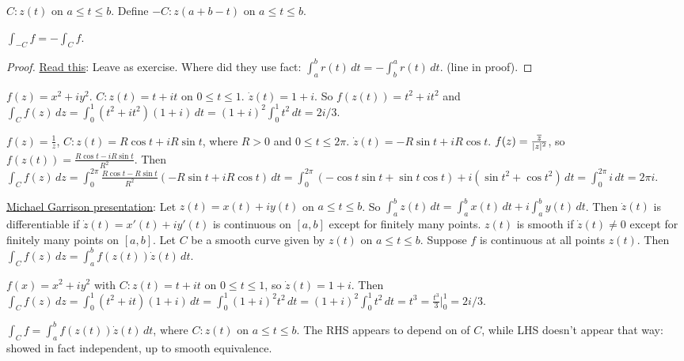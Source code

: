 \documentclass[]{article}
\begin{document}
\begin{definition}
	$C: z(t)$ on $a\leq t \leq b$. Define $-C: z(a+b-t)$ on $a\leq t \leq b$.
\end{definition}
\begin{proposition}
	$\int_{-C} f = -\int_C f$.
\end{proposition}
\begin{proof}
	\underline{Read this}: Leave as exercise. Where did they use fact: $\int_a^b r(t) \, dt = -\int_b^a r(t) \, dt$. (line in proof).
\end{proof}
\begin{example}
	$f(z) = x^2 + iy^2$. $C: z(t) = t+ it$ on $0\leq t \leq 1$. $\dot{z} (t) = 1+i$. So $f(z(t)) = t^2 + it^2$ and $\int_C f(z) \, dz = \int_0^1 (t^2+it^2) ( 1+i) \, dt = (1+i)^2\int_0^1 t^2\, dt = 2i/3$.
\end{example}
\begin{example}
	$f(z) = \frac{1}{z}$, $C:z(t) = R\cos{t} + iR\sin{t}$, where $R>0$ and $0\leq t\leq 2\pi$. $\dot{z}(t) = -R\sin{t} + iR\cos{t}$. $f(z) = \frac{\overline{z}}{|z|^2}$, so $f(z(t)) = \frac{R\cos{t}-iR\sin{t}}{R^2}$. Then $\int_C f(z) \, dz = \int_0^{2\pi} \frac{R\cos{t} - R\sin{t}}{R^2}\left(-R\sin{t} + iR\cos{t}\right) \, dt = \int_0^{2\pi} (-\cos{t}\sin{t}+\sin{t}\cos{t}) + i(\sin{t}^2 + \cos{t}^2) \, dt = \int_0^{2\pi} i\, dt = 2\pi i$.
\end{example}

\underline{Michael Garrison presentation}:
Let $z(t) = x(t) + iy(t)$ on $a\leq t \leq b$. So $\int_a^b z(t) \, dt = \int_a^b x(t) \, dt + i\int_a^b y(t) \, dt$. Then $\dot{z}(t)$ is differentiable if $\dot{z}(t) = x'(t) + iy'(t)$ is continuous on $[a,b]$ except for finitely many points. $z(t)$ is smooth if $\dot{z}(t)\neq 0$ except for finitely many points on $[a,b]$.
Let $C$ be a smooth curve given by $z(t)$ on $a\leq t\leq b$. Suppose $f$ is continuous at all points $z(t)$.
Then $\int_C f(z) \, dz = \int_a^b f(z(t))\dot{z}(t) \, dt$.
\begin{example}
	$f(x) = x^2 + iy^2$ with $C:z(t) = t+it$ on $0\leq t \leq 1$, so $\dot{z}(t) = 1+i$. Then $\int_C f(z) \, dz = \int_0^1 (t^2+it) (1+i) \, dt = \int_0^1 (1+i)^2 t^2 \, dt = (1+i)^2 \int_0^1 t^2 \, dt = t^3 = \frac{t^3}{3} \big\rvert_0^1 = 2i/3$.
\end{example}

$\int_C f = \int_a^b f(z(t))\dot{z}(t) \, dt$, where $C:z(t)$ on $a\leq t\leq b$. The RHS appears to depend on  of $C$, while LHS doesn't appear that way: showed in fact independent, up to smooth equivalence.
\end{document}
